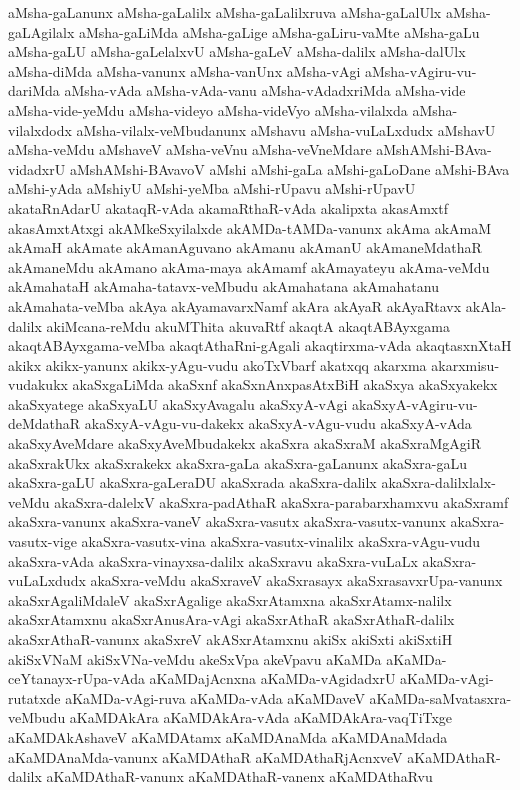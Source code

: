 {aMsha-gaLanunx
aMsha-gaLalilx
aMsha-gaLalilxruva
aMsha-gaLalUlx
aMsha-gaLAgilalx
aMsha-gaLiMda
aMsha-gaLige
aMsha-gaLiru-vaMte
aMsha-gaLu
aMsha-gaLU
aMsha-gaLelalxvU
aMsha-gaLeV
aMsha-dalilx
aMsha-dalUlx
aMsha-diMda
aMsha-vanunx
aMsha-vanUnx
aMsha-vAgi
aMsha-vAgiru-vu-dariMda
aMsha-vAda
aMsha-vAda-vanu
aMsha-vAdadxriMda
aMsha-vide
aMsha-vide-yeMdu
aMsha-videyo
aMsha-videVyo
aMsha-vilalxda
aMsha-vilalxdodx
aMsha-vilalx-veMbudanunx
aMshavu
aMsha-vuLaLxdudx
aMshavU
aMsha-veMdu
aMshaveV
aMsha-veVnu
aMsha-veVneMdare
aMshAMshi-BAva-vidadxrU
aMshAMshi-BAvavoV
aMshi
aMshi-gaLa
aMshi-gaLoDane
aMshi-BAva
aMshi-yAda
aMshiyU
aMshi-yeMba
aMshi-rUpavu
aMshi-rUpavU
akataRnAdarU
akataqR-vAda
akamaRthaR-vAda
akalipxta
akasAmxtf
akasAmxtAtxgi
akAMkeSxyilalxde
akAMDa-tAMDa-vanunx
akAma
akAmaM
akAmaH
akAmate
akAmanAguvano
akAmanu
akAmanU
akAmaneMdathaR
akAmaneMdu
akAmano
akAma-maya
akAmamf
akAmayateyu
akAma-veMdu
akAmahataH
akAmaha-tatavx-veMbudu
akAmahatana
akAmahatanu
akAmahata-veMba
akAya
akAyamavarxNamf
akAra
akAyaR
akAyaRtavx
akAla-dalilx
akiMcana-reMdu
akuMThita
akuvaRtf
akaqtA
akaqtABAyxgama
akaqtABAyxgama-veMba
akaqtAthaRni-gAgali
akaqtirxma-vAda
akaqtasxnXtaH
akikx
akikx-yanunx
akikx-yAgu-vudu
akoTxVbarf
akatxqq
akarxma
akarxmisu-vudakukx
akaSxgaLiMda
akaSxnf
akaSxnAnxpasAtxBiH
akaSxya
akaSxyakekx
akaSxyatege
akaSxyaLU
akaSxyAvagalu
akaSxyA-vAgi
akaSxyA-vAgiru-vu-deMdathaR
akaSxyA-vAgu-vu-dakekx
akaSxyA-vAgu-vudu
akaSxyA-vAda
akaSxyAveMdare
akaSxyAveMbudakekx
akaSxra
akaSxraM
akaSxraMgAgiR
akaSxrakUkx
akaSxrakekx
akaSxra-gaLa
akaSxra-gaLanunx
akaSxra-gaLu
akaSxra-gaLU
akaSxra-gaLeraDU
akaSxrada
akaSxra-dalilx
akaSxra-dalilxlalx-veMdu
akaSxra-dalelxV
akaSxra-padAthaR
akaSxra-parabarxhamxvu
akaSxramf
akaSxra-vanunx
akaSxra-vaneV
akaSxra-vasutx
akaSxra-vasutx-vanunx
akaSxra-vasutx-vige
akaSxra-vasutx-vina
akaSxra-vasutx-vinalilx
akaSxra-vAgu-vudu
akaSxra-vAda
akaSxra-vinayxsa-dalilx
akaSxravu
akaSxra-vuLaLx
akaSxra-vuLaLxdudx
akaSxra-veMdu
akaSxraveV
akaSxrasayx
akaSxrasavxrUpa-vanunx
akaSxrAgaliMdaleV
akaSxrAgalige
akaSxrAtamxna
akaSxrAtamx-nalilx
akaSxrAtamxnu
akaSxrAnusAra-vAgi
akaSxrAthaR
akaSxrAthaR-dalilx
akaSxrAthaR-vanunx
akaSxreV
akASxrAtamxnu
akiSx
akiSxti
akiSxtiH
akiSxVNaM
akiSxVNa-veMdu
akeSxVpa
akeVpavu
aKaMDa
aKaMDa-ceYtanayx-rUpa-vAda
aKaMDajAcnxna
aKaMDa-vAgidadxrU
aKaMDa-vAgi-rutatxde
aKaMDa-vAgi-ruva
aKaMDa-vAda
aKaMDaveV
aKaMDa-saMvatasxra-veMbudu
aKaMDAkAra
aKaMDAkAra-vAda
aKaMDAkAra-vaqTiTxge
aKaMDAkAshaveV
aKaMDAtamx
aKaMDAnaMda
aKaMDAnaMdada
aKaMDAnaMda-vanunx
aKaMDAthaR
aKaMDAthaRjAcnxveV
aKaMDAthaR-dalilx
aKaMDAthaR-vanunx
aKaMDAthaR-vanenx
aKaMDAthaRvu
}
